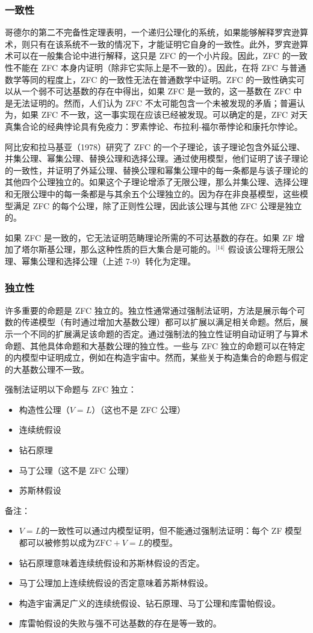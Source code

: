 \subsubsection{一致性} 
哥德尔的第二不完备性定理表明，一个递归公理化的系统，如果能够解释罗宾逊算术，则只有在该系统不一致的情况下，才能证明它自身的一致性。此外，罗宾逊算术可以在一般集合论中进行解释，这只是 ZFC 的一个小片段。因此，ZFC 的一致性不能在 ZFC 本身内证明（除非它实际上是不一致的）。因此，在将 ZFC 与普通数学等同的程度上，ZFC 的一致性无法在普通数学中证明。ZFC 的一致性确实可以从一个弱不可达基数的存在中得出，如果 ZFC 是一致的，这一基数在 ZFC 中是无法证明的。然而，人们认为 ZFC 不太可能包含一个未被发现的矛盾；普遍认为，如果 ZFC 不一致，这一事实现在应该已经被发现。可以确定的是，ZFC 对天真集合论的经典悖论具有免疫力：罗素悖论、布拉利-福尔蒂悖论和康托尔悖论。

阿比安和拉马基亚（1978）研究了 ZFC 的一个子理论，该子理论包含外延公理、并集公理、幂集公理、替换公理和选择公理。通过使用模型，他们证明了该子理论的一致性，并证明了外延公理、替换公理和幂集公理中的每一条都是与该子理论的其他四个公理独立的。如果这个子理论增添了无限公理，那么并集公理、选择公理和无限公理中的每一条都是与其余五个公理独立的。因为存在非良基模型，这些模型满足 ZFC 的每个公理，除了正则性公理，因此该公理与其他 ZFC 公理是独立的。

如果 ZFC 是一致的，它无法证明范畴理论所需的不可达基数的存在。如果 ZF 增加了塔尔斯基公理，那么这种性质的巨大集合是可能的。\(^\text{[14]}\) 假设该公理将无限公理、幂集公理和选择公理（上述 7-9）转化为定理。
\subsubsection{独立性} 
许多重要的命题是 ZFC 独立的。独立性通常通过强制法证明，方法是展示每个可数的传递模型（有时通过增加大基数公理）都可以扩展以满足相关命题。然后，展示一个不同的扩展满足该命题的否定。通过强制法的独立性证明自动证明了与算术命题、其他具体命题和大基数公理的独立性。一些与 ZFC 独立的命题可以在特定的内模型中证明成立，例如在构造宇宙中。然而，某些关于构造集合的命题与假定的大基数公理不一致。

强制法证明以下命题与 ZFC 独立：
\begin{itemize}
\item 构造性公理（\( V = L \)）（这也不是 ZFC 公理）
\item 连续统假设
\item 钻石原理
\item 马丁公理（这不是 ZFC 公理）
\item 苏斯林假设
\end{itemize}
备注：
\begin{itemize}
\item \( V = L \)的一致性可以通过内模型证明，但不能通过强制法证明：每个 ZF 模型都可以被修剪以成为\( \text{ZFC} + V = L \)的模型。
\item 钻石原理意味着连续统假设和苏斯林假设的否定。
\item 马丁公理加上连续统假设的否定意味着苏斯林假设。
\item 构造宇宙满足广义的连续统假设、钻石原理、马丁公理和库雷帕假设。
\item 库雷帕假设的失败与强不可达基数的存在是等一致的。
\end{itemize}